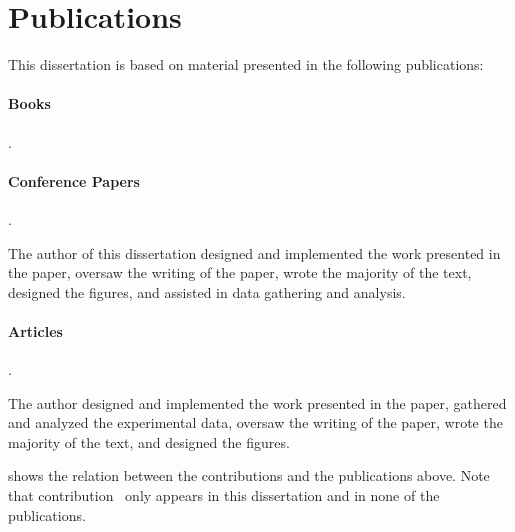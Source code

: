 \section{Publications}

This dissertation is based on material presented in the following publications:


\paragraph{Books}

\begin{publications}
  \item {}
    .
\end{publications}


\paragraph{Conference Papers}

\begin{publications}[resume]
  \item {}
    .
    \begin{authorsContribution}
      The author of this dissertation designed and implemented the work
      presented in the paper, oversaw the writing of the paper, wrote the
      majority of the text, designed the figures, and assisted in data gathering
      and analysis.
    \end{authorsContribution}
\end{publications}


\paragraph{Articles}

\begin{publications}[resume]
  \item {}
    .
    \begin{authorsContribution}
      The author designed and implemented the work presented in the paper,
      gathered and analyzed the experimental data, oversaw the writing of the
      paper, wrote the majority of the text, and designed the figures.
    \end{authorsContribution}
\end{publications}
%
 shows the relation between the
contributions and the publications above.
%
Note that contribution~ only appears in this
dissertation and in none of the publications.


